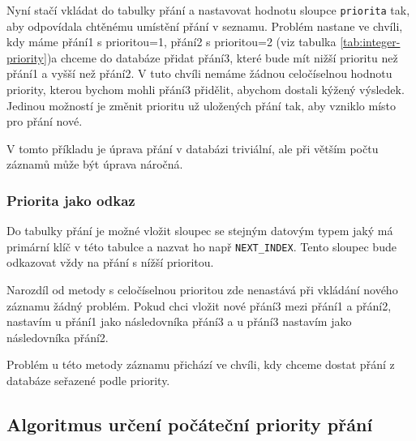 Nyní stačí vkládat do tabulky přání a nastavovat hodnotu sloupce \verb|priorita| tak, aby odpovídala chtěnému umístění přání v seznamu. Problém nastane ve chvíli, kdy máme přání1 s prioritou=1, přání2 s prioritou=2 (viz tabulka \ref{tab:integer-priority})a chceme do databáze přidat přání3, které bude mít nižší prioritu než přání1 a vyšší než přání2. V tuto chvíli nemáme žádnou celočíselnou hodnotu priority, kterou bychom mohli přání3 přidělit, abychom dostali kýžený výsledek. Jedinou možností je změnit prioritu už uložených přání tak, aby vzniklo místo pro přání nové.

V tomto příkladu je úprava přání v databázi triviální, ale při větším počtu záznamů může být úprava náročná. 

\subsubsection{Priorita jako odkaz}
Do tabulky přání je možné vložit sloupec se stejným datovým typem jaký má primární klíč v této tabulce a nazvat ho např \verb|NEXT_INDEX|. Tento sloupec bude odkazovat vždy na přání s nížší prioritou.

Narozdíl od metody s celočíselnou prioritou zde nenastává při vkládání nového záznamu žádný problém. Pokud chci vložit nové přání3 mezi přání1 a přání2, nastavím u přání1 jako následovníka přání3 a u přání3 nastavím jako následovníka přání2.

Problém u této metody záznamu přichází ve chvíli, kdy chceme dostat přání z databáze seřazené podle priority.

\subsection{Algoritmus určení počáteční priority přání}
